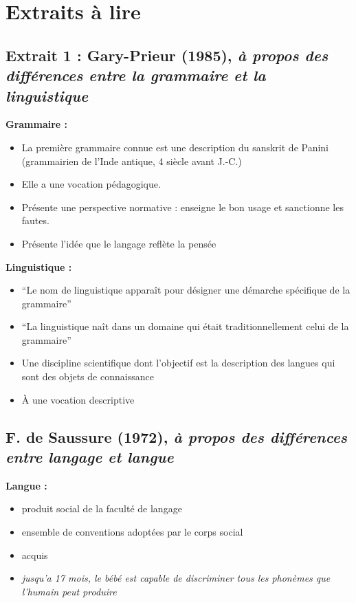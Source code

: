\section{Extraits à lire}

\subsection{Extrait 1 : Gary-Prieur (1985), \textit{à propos des différences entre la grammaire et la linguistique}}

\textbf{Grammaire :}
    \begin{itemize} 
       \item La première grammaire connue est une description du sanskrit de Panini (grammairien de l'Inde antique, 4 siècle avant J.-C.)
       \item Elle a une vocation pédagogique.
       \item Présente une perspective normative : enseigne le bon usage et sanctionne les fautes.
       \item Présente l'idée que le langage reflète la pensée 
    \end{itemize}

\textbf{Linguistique :}
    \begin{itemize} 
         \item \enquote{Le nom de linguistique apparaît pour désigner une démarche spécifique de la grammaire}
         \item \enquote{La linguistique naît dans un domaine qui était traditionnellement celui de la grammaire}
         \item Une discipline scientifique dont l'objectif est la description des langues qui sont des objets de connaissance
         \item À une vocation descriptive
    \end{itemize}
\subsection{F. de Saussure (1972), \textit{à propos des différences entre langage et langue}}

\textbf{Langue :}
\begin{itemize}
   \item produit social de la faculté de langage
   \item ensemble de conventions adoptées par le corps social
   \item acquis
   \item \textit{jusqu'a 17 mois, le bébé est capable de discriminer tous les phonèmes que l'humain peut produire}
\end{itemize}

